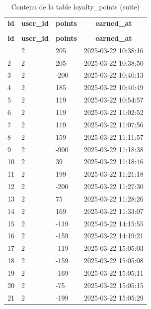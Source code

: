 %
%
 \begin{longtable}{|l|l|l|l|} 
 \hline \endhead \hline \endfoot \hline 
 \caption{Contenu de la table loyalty\_points} \label{tab:loyalty_points-data} \\\hline \multicolumn{1}{|c|}{\textbf{id}} & \multicolumn{1}{|c|}{\textbf{user\_id}} & \multicolumn{1}{|c|}{\textbf{points}} & \multicolumn{1}{|c|}{\textbf{earned\_at}} \\ \hline \hline  \endfirsthead 
\caption{Contenu de la table loyalty\_points (suite)} \\ \hline \multicolumn{1}{|c|}{\textbf{id}} & \multicolumn{1}{|c|}{\textbf{user\_id}} & \multicolumn{1}{|c|}{\textbf{points}} & \multicolumn{1}{|c|}{\textbf{earned\_at}} \\ \hline \hline \endhead \endfoot
1 & 2 & 205 & 2025-03-22 10:38:16 \\ \hline 
2 & 2 & 205 & 2025-03-22 10:38:50 \\ \hline 
3 & 2 & -200 & 2025-03-22 10:40:13 \\ \hline 
4 & 2 & 185 & 2025-03-22 10:40:49 \\ \hline 
5 & 2 & 119 & 2025-03-22 10:54:57 \\ \hline 
6 & 2 & 119 & 2025-03-22 11:02:52 \\ \hline 
7 & 2 & 119 & 2025-03-22 11:07:56 \\ \hline 
8 & 2 & 159 & 2025-03-22 11:11:57 \\ \hline 
9 & 2 & -900 & 2025-03-22 11:18:38 \\ \hline 
10 & 2 & 39 & 2025-03-22 11:18:46 \\ \hline 
11 & 2 & 199 & 2025-03-22 11:21:18 \\ \hline 
12 & 2 & -200 & 2025-03-22 11:27:30 \\ \hline 
13 & 2 & 75 & 2025-03-22 11:28:26 \\ \hline 
14 & 2 & 169 & 2025-03-22 11:33:07 \\ \hline 
15 & 2 & -119 & 2025-03-22 14:15:55 \\ \hline 
16 & 2 & -159 & 2025-03-22 14:19:21 \\ \hline 
17 & 2 & -119 & 2025-03-22 15:05:03 \\ \hline 
18 & 2 & -159 & 2025-03-22 15:05:08 \\ \hline 
19 & 2 & -169 & 2025-03-22 15:05:11 \\ \hline 
20 & 2 & -75 & 2025-03-22 15:05:15 \\ \hline 
21 & 2 & -199 & 2025-03-22 15:05:29 \\ \hline 

\end{longtable}
